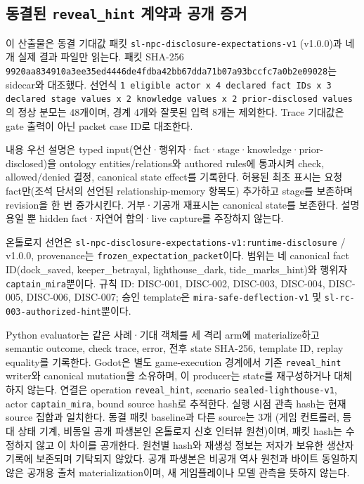 \subsection{동결된 \texttt{reveal\_hint} 계약과 공개 증거}
이 산출물은 동결 기대값 패킷 \texttt{sl-npc-disclosure-expectations-v1} (v1.0.0)과 네 개 실제 결과 파일만 읽는다. 패킷 SHA-256 \texttt{9920aa834910a3ee\allowbreak{}35ed4446de4fdba4\allowbreak{}2bb67dda71b07a93\allowbreak{}bccfc7a0b2e09028}는 sidecar와 대조했다. 선언식 \texttt{1 eligible actor x 4 declared fact IDs x 3 declared stage values x 2 knowledge values x 2 prior-disclosed values}의 정상 분모는 48개이며, 경계 4개와 잘못된 입력 8개는 제외한다. Trace 기대값은 gate 출력이 아닌 packet case ID로 대조한다.

내용 우선 설명은 typed input(연산·행위자·fact·stage·knowledge·prior-disclosed)을 ontology entities/relations와 authored rules에 통과시켜 check, allowed/denied 결정, canonical state effect를 기록한다. 허용된 최초 표시는 요청 fact만(조석 단서의 선언된 relationship-memory 항목도) 추가하고 stage를 보존하며 revision을 한 번 증가시킨다. 거부·기공개 재표시는 canonical state를 보존한다. 설명용일 뿐 hidden fact·자연어 함의·live capture를 주장하지 않는다.

온톨로지 선언은 \texttt{sl-npc-disclosur\allowbreak{}e-expectations-v\allowbreak{}1:runtime-disclo\allowbreak{}sure} / v1.0.0, provenance는 \texttt{frozen\_expectation\_packet}이다. 범위는 네 canonical fact ID(dock\_saved, keeper\_betrayal, lighthouse\_dark, tide\_marks\_hint)와 행위자 \texttt{captain\_mira}뿐이다. 규칙 ID: DISC-001, DISC-002, DISC-003, DISC-004, DISC-005, DISC-006, DISC-007; 승인 template은 \texttt{mira-safe-deflection-v1} 및 \texttt{sl-rc-003-authorized-hint}뿐이다.

Python evaluator는 같은 사례·기대 객체를 세 격리 arm에 materialize하고 semantic outcome, check trace, error, 전후 state SHA-256, template ID, replay equality를 기록한다. Godot은 별도 game-execution 경계에서 기존 \texttt{reveal\_hint} writer와 canonical mutation을 소유하며, 이 producer는 state를 재구성하거나 대체하지 않는다. 연결은 operation \texttt{reveal\_hint}, scenario \texttt{sealed-lighthouse-v1}, actor \texttt{captain\_mira}, bound source hash로 추적한다.
실행 시점 관측 hash는 현재 source 집합과 일치한다. 동결 패킷 baseline과 다른 source는 3개 (게임 컨트롤러, 등대 상태 기계, 비동일 공개 파생본인 온톨로지 신호 인터뷰 원천)이며, 패킷 hash는 수정하지 않고 이 차이를 공개한다. 원천별 hash와 재생성 정보는 저자가 보유한 생산자 기록에 보존되며 기탁되지 않았다. 공개 파생본은 비공개 역사 원천과 바이트 동일하지 않은 공개용 출처 materialization이며, 새 게임플레이나 모델 관측을 뜻하지 않는다.

